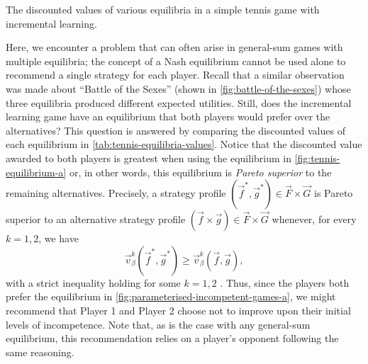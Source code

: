     \begin{table}[t]
        \centering
        
        \caption[Discounted Values of Equilibria in a Tennis Game with Learning]{The discounted values of various equilibria in a simple tennis game with incremental learning.}
        \label{tab:tennis-equilibria-values}
    \end{table}

    Here, we encounter a problem that can often arise in general-sum games with multiple equilibria; the concept of a Nash equilibrium cannot be used alone to recommend a single strategy for each player.
    Recall that a similar observation was made about ``Battle of the Sexes'' (shown in \autoref{fig:battle-of-the-sexes}) whose three equilibria produced different expected utilities.
    Still, does the incremental learning game have an equilibrium that both players would prefer over the alternatives?
    This question is answered by comparing the discounted values of each equilibrium in \autoref{tab:tennis-equilibria-values}.
    Notice that the discounted value awarded to both players is greatest when using the equilibrium in \autoref{fig:tennis-equilibrium-a} or, in other words, this equilibrium is \emph{Pareto superior} to the remaining alternatives.
    Precisely, a strategy profile $(\vec{f}^*, \vec{g}^*) \in \vec{F} \times \vec{G}$ is Pareto superior to an alternative strategy profile $(\vec{f} \times \vec{g}) \in \vec{F} \times \vec{G}$ whenever, for every $k = 1, 2$, we have
    \[
        \vec{v}^k_\beta(\vec{f}^*, \vec{g}^*)
            \ge \vec{v}^k_\beta(\vec{f}, \vec{g}),
    \]
    with a strict inequality holding for some $k = 1, 2$ \parencite{Osborne1994}.
    Thus, since the players both prefer the equilibrium in \autoref{fig:parameterised-incompetent-games-a}, we might recommend that Player 1 and Player 2 choose not to improve upon their initial levels of incompetence.
    Note that, as is the case with any general-sum equilibrium, this recommendation relies on a player's opponent following the same reasoning.
